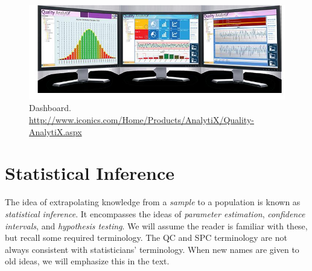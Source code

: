 \documentclass[12pt,a4paper]{report}
\theoremstyle{plain}
\theoremstyle{definition}
\begin{document}
\begin{figure}[h]
\centering
\includegraphics[height=0.3\textheight, width=0.9\linewidth]{art/dashboard}
\caption[Dashboard]{Dashboard. \newline
\url{http://www.iconics.com/Home/Products/AnalytiX/Quality-AnalytiX.aspx}}
\label{fig:dashboard}
\end{figure}

\afterpage{\clearpage}

\chapter{Statistical Inference} 
\label{sec:inference}

The idea of extrapolating knowledge from a \emph{sample} to a population is known as \emph{statistical inference}.
It encompasses the ideas of \emph{parameter estimation}, \emph{confidence intervals}, and \emph{hypothesis testing}.
We will assume the reader is familiar with these, but recall some required terminology.
The QC and SPC terminology are not always consistent with statisticians' terminology. When new names are given to old ideas, we will emphasize this in the text.
\end{document}
